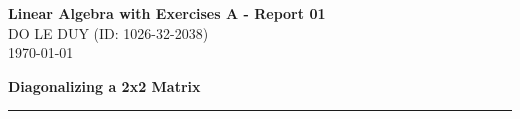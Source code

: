 
\newcommand{\myclass}{Linear Algebra with Exercises A}
\newcommand{\myname}{DO LE DUY}
\newcommand{\myhwtype}{Report 01}
\newcommand{\writtensection}{}
\newcommand{\mystudentid}{1026-32-2038}



\thispagestyle{plain}
\begin{center}
  {\Large \textbf{\myclass{} - \myhwtype{} }}\\
  \vspace{0.6em} {\myname{} (\small{ID: \mystudentid{}})} \\
  \today
\end{center}


\textbf{Diagonalizing a 2x2 Matrix}
\vspace{0.3em} \hrule \vspace{.1in}


